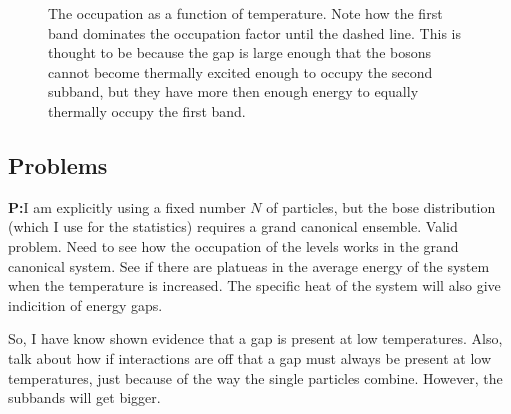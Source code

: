 \documentclass[12pt]{article}
\begin{document}
\begin{figure}[H]%
 	\centering
          \caption{The occupation as a function of temperature. Note how the
		  first band dominates the occupation factor until the dashed line. 
	  This is thought to be because the gap is large enough that the bosons
		  cannot become thermally excited enough to occupy the second subband,
		  but they have more then enough energy to equally thermally occupy the
		  first band.} 
         \label{Occup}
\end{figure}


\subsection{Problems}
\textbf{P:}I am explicitly using a fixed number $N$ of particles, but the bose distribution (which I use for the statistics) requires
a grand canonical ensemble. 
 Valid problem. Need to see how the occupation of the levels works in the grand canonical system. See if there are platueas in the
average energy of the system when the temperature is increased. The specific heat of the system will also give indicition of energy gaps.


So, I have know shown evidence that a gap is present at low temperatures. Also, talk about how
if interactions are off that a gap must always be present at low temperatures, just because of the way the single particles combine. However, the subbands will get bigger.
\end{document}
